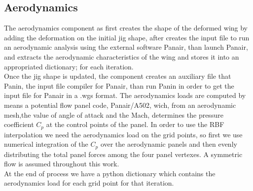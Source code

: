 \subsection{Aerodynamics}
The aerodynamics component as first creates the shape of the deformed wing by adding the deformation on the initial jig shape, after creates the input file to run an aerodynamic analysis using the external software Panair, than launch Panair, and extracts the aerodynamic characteristics of the wing and stores it into an appropriated dictionary; for each iteration.\\
Once the jig shape is updated, the component creates an auxiliary file that Panin, the input file compiler for Panair, than run Panin in order to get the input file for Panair in a .wgs format.
The aerodynamics loads are computed by means a potential flow panel code, Panair/A502, wich, from an aerodynamic mesh,the value of angle of attack and the Mach, determines the pressure coefficient $C_p$ at the control points of the panel. In order to use the RBF interpolation we need the aerodynamics load on the grid points, so first we use numerical integration of the $C_p$ over the aerodynamic panels and then evenly distributing the total panel forces among the four panel vertexes. A symmetric flow is assumed throughout this work.\\ At the end of process we have a python dictionary which contains the aerodynamics load for each grid point for that iteration.

